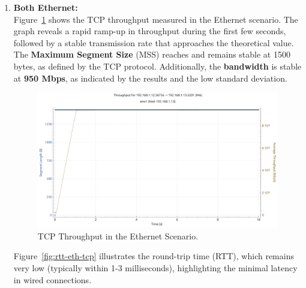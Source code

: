        \begin{enumerate}

            \item \textbf{Both Ethernet:} \\
                Figure~\ref{fig:throughput-eth-tcp} shows the TCP throughput measured in the Ethernet scenario. 
                The graph reveals a rapid ramp-up in throughput during the first few seconds, followed by a stable transmission rate that approaches the theoretical value. 
                The \textbf{Maximum Segment Size} (MSS) reaches and remains stable at 1500 bytes, as defined by the TCP protocol. Additionally, the \textbf{bandwidth} is stable at \textbf{950 Mbps}, as indicated by the results and the low standard deviation.              
                
                \vspace{-0.1cm} %

                \begin{figure}[ht]
                    \centering
                    \includegraphics[width=0.9\columnwidth]{images/graphs/Throughput/Throughput_ETH_TCP.pdf}
                    \caption{TCP Throughput in the Ethernet Scenario.}
                    \label{fig:throughput-eth-tcp}
                \end{figure}

                Figure~\ref{fig:rtt-eth-tcp} illustrates the round-trip time (RTT), which remains very low (typically within 1-3 milliseconds), highlighting the minimal latency in wired connections. 
                

\end{enumerate}

